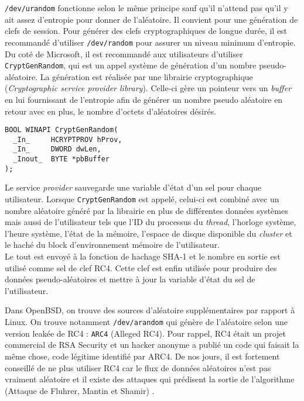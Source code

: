 \texttt{/dev/urandom} fonctionne selon le même principe sauf qu'il n'attend pas qu'il y ait assez d'entropie pour donner de l'aléatoire. Il convient pour une génération de clefs de session. Pour générer des clefs cryptographiques de longue durée, il est recommandé d'utiliser \texttt{/dev/random} pour assurer un niveau minimum d'entropie.\\

Du coté de Microsoft, il est recommandé aux utilisateurs d'utiliser \texttt{CryptGenRandom}, qui est un appel système de génération d'un nombre pseudo-aléatoire. La génération est réalisée par une librairie cryptographique (\textit{Cryptographic service provider library}). Celle-ci gère un pointeur vers un \textit{buffer} en lui fournissant de l'entropie afin de générer un nombre pseudo aléatoire en retour avec en plus, le nombre d'octets d'aléatoires désirés.

\begin{verbatim}
BOOL WINAPI CryptGenRandom(
  _In_     HCRYPTPROV hProv,
  _In_     DWORD dwLen,
  _Inout_  BYTE *pbBuffer
);
\end{verbatim}


Le service \textit{provider} sauvegarde une variable d'état d'un sel pour chaque utilisateur. Lorsque \texttt{CryptGenRandom} est appelé, celui-ci est combiné avec un nombre aléatoire généré par la librairie en plus de différentes données systèmes mais aussi de l'utilisateur tels que l'ID du processus  du \textit{thread}, l'horloge système, l'heure système, l'état de la mémoire, l'espace de disque disponible du \textit{cluster} et le haché du block d'environnement mémoire de l'utilisateur. \\

Le tout est envoyé à la fonction de hachage SHA-1 et le nombre en sortie est utilisé comme sel de clef RC4.  Cette clef est enfin utilisée pour produire des données pseudo-aléatoires et mettre à jour la variable d'état du sel de l'utilisateur. 

Dans OpenBSD, on trouve des sources d'aléatoire supplémentaires par rapport à Linux. On trouve notamment \texttt{/dev/arandom} qui génère de l'aléatoire selon une version leakée de RC4 : \texttt{ARC4} (Alleged RC4). Pour rappel, RC4 était un projet commercial de RSA Security et un hacker anonyme a publié un code qui faisait la même chose, code légitime identifié par ARC4. De nos jours, il est fortement conseillé de ne plus utiliser RC4 car le flux de données aléatoires n'est pas vraiment aléatoire et il existe des attaques qui prédisent la sortie de l'algorithme (Attaque de Fluhrer, Mantin et Shamir) \nocite{Fluhrer01weaknessesin}.


